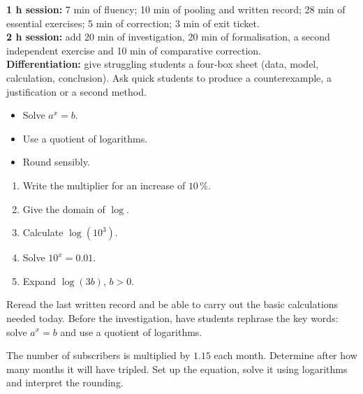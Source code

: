 \ifprof
\begin{methode}
\textbf{1 h session:} 7 min of fluency; 10 min of pooling and written record; 28 min of essential exercises; 5 min of correction; 3 min of exit ticket.\\
\textbf{2 h session:} add 20 min of investigation, 20 min of formalisation, a second independent exercise and 10 min of comparative correction.\\
\textbf{Differentiation:} give struggling students a four-box sheet (data, model, calculation, conclusion). Ask quick students to produce a counterexample, a justification or a second method.
\end{methode}
\fi
{}
\begin{objectifs}\begin{itemize}\item Solve $a^x=b$.\item Use a quotient of logarithms.\item Round sensibly.\end{itemize}\end{objectifs}
\begin{automatismes}\begin{enumerate}\item Write the multiplier for an increase of $10\,\%$. \item Give the domain of $\log$. \rep{$]0,+\infty[$}\item Calculate $\log(10^3)$. \item Solve $10^x=0.01$. \item Expand $\log(3b)$, $b>0$. \end{enumerate}\end{automatismes}
\begin{prerequis}Reread the last written record and be able to carry out the basic calculations needed today. Before the investigation, have students rephrase the key words: solve $a^x=b$ and use a quotient of logarithms.\end{prerequis}

\begin{activite}
The number of subscribers is multiplied by $1.15$ each month. Determine after how many months it will have tripled. Set up the equation, solve it using logarithms and interpret the rounding.

\end{activite}

